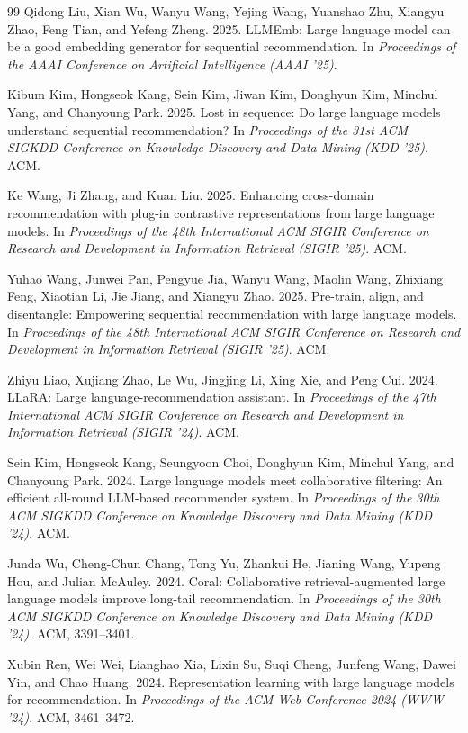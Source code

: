 ﻿\documentclass{article}
\begin{document}
\begin{thebibliography}{99}
Qidong Liu, Xian Wu, Wanyu Wang, Yejing Wang, Yuanshao Zhu, Xiangyu Zhao, Feng Tian, and Yefeng Zheng. 2025.
LLMEmb: Large language model can be a good embedding generator for sequential recommendation.
In \textit{Proceedings of the AAAI Conference on Artificial Intelligence (AAAI '25)}.

Kibum Kim, Hongseok Kang, Sein Kim, Jiwan Kim, Donghyun Kim, Minchul Yang, and Chanyoung Park. 2025.
Lost in sequence: Do large language models understand sequential recommendation?
In \textit{Proceedings of the 31st ACM SIGKDD Conference on Knowledge Discovery and Data Mining (KDD '25)}. ACM.

Ke Wang, Ji Zhang, and Kuan Liu. 2025.
Enhancing cross-domain recommendation with plug-in contrastive representations from large language models.
In \textit{Proceedings of the 48th International ACM SIGIR Conference on Research and Development in Information Retrieval (SIGIR '25)}. ACM.

Yuhao Wang, Junwei Pan, Pengyue Jia, Wanyu Wang, Maolin Wang, Zhixiang Feng, Xiaotian Li, Jie Jiang, and Xiangyu Zhao. 2025.
Pre-train, align, and disentangle: Empowering sequential recommendation with large language models.
In \textit{Proceedings of the 48th International ACM SIGIR Conference on Research and Development in Information Retrieval (SIGIR '25)}. ACM.

Zhiyu Liao, Xujiang Zhao, Le Wu, Jingjing Li, Xing Xie, and Peng Cui. 2024.
LLaRA: Large language-recommendation assistant.
In \textit{Proceedings of the 47th International ACM SIGIR Conference on Research and Development in Information Retrieval (SIGIR '24)}. ACM.

Sein Kim, Hongseok Kang, Seungyoon Choi, Donghyun Kim, Minchul Yang, and Chanyoung Park. 2024.
Large language models meet collaborative filtering: An efficient all-round LLM-based recommender system.
In \textit{Proceedings of the 30th ACM SIGKDD Conference on Knowledge Discovery and Data Mining (KDD '24)}. ACM.

Junda Wu, Cheng-Chun Chang, Tong Yu, Zhankui He, Jianing Wang, Yupeng Hou, and Julian McAuley. 2024.
Coral: Collaborative retrieval-augmented large language models improve long-tail recommendation.
In \textit{Proceedings of the 30th ACM SIGKDD Conference on Knowledge Discovery and Data Mining (KDD '24)}. ACM, 3391--3401.

Xubin Ren, Wei Wei, Lianghao Xia, Lixin Su, Suqi Cheng, Junfeng Wang, Dawei Yin, and Chao Huang. 2024.
Representation learning with large language models for recommendation.
In \textit{Proceedings of the ACM Web Conference 2024 (WWW '24)}. ACM, 3461--3472.


\end{thebibliography}
\end{document}

